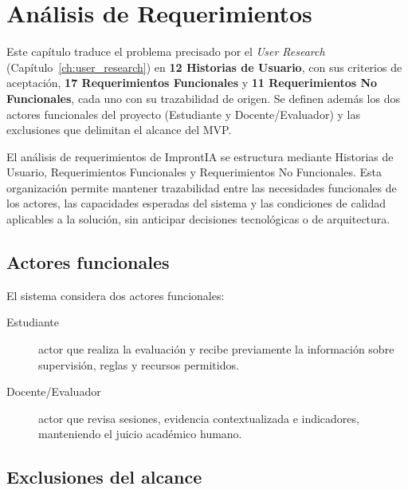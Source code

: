 \chapter{Análisis de Requerimientos}
\label{ch:requerimientos}

\begin{chapterabstract}
Este capítulo traduce el problema precisado por el \textit{User Research} (Capítulo~\ref{ch:user_research}) en \textbf{12 Historias de Usuario}, con sus criterios de aceptación, \textbf{17 Requerimientos Funcionales} y \textbf{11 Requerimientos No Funcionales}, cada uno con su trazabilidad de origen. Se definen además los dos actores funcionales del proyecto (Estudiante y Docente/Evaluador) y las exclusiones que delimitan el alcance del MVP.
\end{chapterabstract}

El análisis de requerimientos de ImprontIA se estructura mediante Historias de Usuario, Requerimientos Funcionales y Requerimientos No Funcionales. Esta organización permite mantener trazabilidad entre las necesidades funcionales de los actores, las capacidades esperadas del sistema y las condiciones de calidad aplicables a la solución, sin anticipar decisiones tecnológicas o de arquitectura.

\section{Actores funcionales}
\label{sec:actores}

El sistema considera dos actores funcionales:

\begin{description}
    \item[Estudiante] actor que realiza la evaluación y recibe previamente la información sobre supervisión, reglas y recursos permitidos.
    \item[Docente/Evaluador] actor que revisa sesiones, evidencia contextualizada e indicadores, manteniendo el juicio académico humano.
\end{description}

\section{Exclusiones del alcance}

